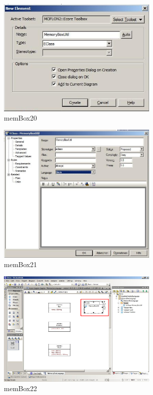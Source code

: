 \begin{figure}[!h]
	\centering
  \includegraphics[width=0.7\textwidth]{pics/memBox20.png}
	\caption{memBox20}
	\label{memBox20}
\end{figure}

\begin{figure}[!h]
	\centering
  \includegraphics[width=0.7\textwidth]{pics/memBox21.png}
	\caption{memBox21}
	\label{memBox21}
\end{figure}

\begin{figure}[!h]
	\centering
  \includegraphics[width=0.7\textwidth]{pics/memBox22.png}
	\caption{memBox22}
	\label{memBox22}
\end{figure}

